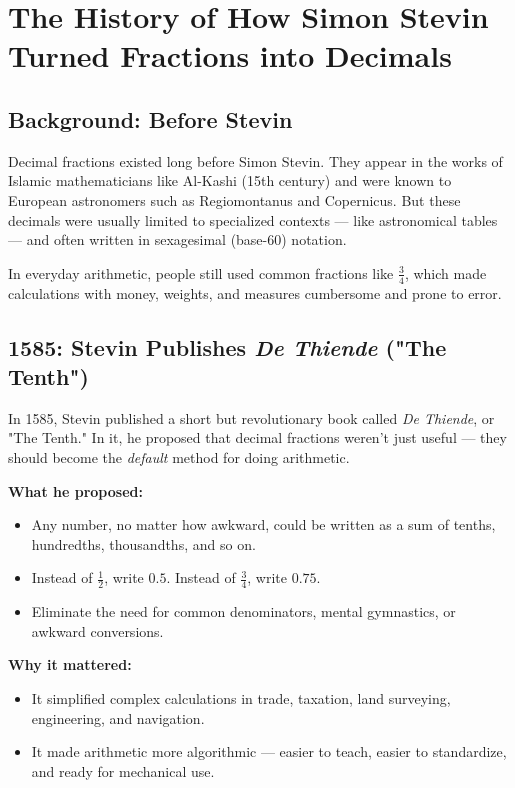 \section{The History of How Simon Stevin Turned Fractions into Decimals}

\subsection{Background: Before Stevin}

Decimal fractions existed long before Simon Stevin. They appear in the works of Islamic mathematicians like Al-Kashi (15th century) and were known to European astronomers such as Regiomontanus and Copernicus. But these decimals were usually limited to specialized contexts — like astronomical tables — and often written in sexagesimal (base-60) notation.

\medskip

In everyday arithmetic, people still used common fractions like \( \frac{3}{4} \), which made calculations with money, weights, and measures cumbersome and prone to error.

\subsection*{1585: Stevin Publishes \textit{De Thiende} ("The Tenth")}

In 1585, Stevin published a short but revolutionary book called \textit{De Thiende}, or "The Tenth." In it, he proposed that decimal fractions weren't just useful — they should become the \textit{default} method for doing arithmetic.

\medskip

\textbf{What he proposed:}
\begin{itemize}
    \item Any number, no matter how awkward, could be written as a sum of tenths, hundredths, thousandths, and so on.
    \item Instead of \( \frac{1}{2} \), write \( 0.5 \). Instead of \( \frac{3}{4} \), write \( 0.75 \).
    \item Eliminate the need for common denominators, mental gymnastics, or awkward conversions.
\end{itemize}

\medskip

\textbf{Why it mattered:}
\begin{itemize}
    \item It simplified complex calculations in trade, taxation, land surveying, engineering, and navigation.
    \item It made arithmetic more algorithmic — easier to teach, easier to standardize, and ready for mechanical use.
\end{itemize}

